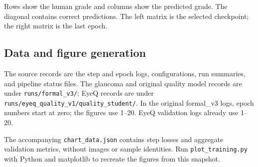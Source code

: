 \documentclass[
  10pt,
]{article}
\begin{document}
Rows show the human grade and columns show the predicted grade. The diagonal contains correct predictions. The left matrix is the selected checkpoint; the right matrix is the last epoch.

\subsection{Data and figure generation}\label{data-and-figure-generation}

The source records are the step and epoch logs, configurations, run summaries, and pipeline status files. The glaucoma and original quality model records are under \texttt{runs/formal\_v3/}; EyeQ records are under \texttt{runs/eyeq\_quality\_v1/quality\_student/}. In the original formal\_v3 logs, epoch numbers start at zero; the figures use 1--20. EyeQ validation logs already use 1--20.

The accompanying \texttt{chart\_data.json} contains step losses and aggregate validation metrics, without images or sample identities. Run \texttt{plot\_training.py} with Python and matplotlib to recreate the figures from this snapshot.
\end{document}
